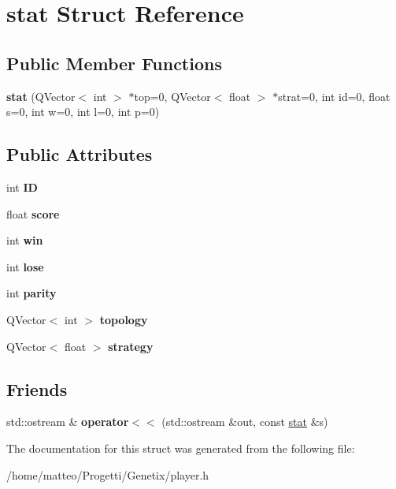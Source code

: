 \hypertarget{structstat}{}\section{stat Struct Reference}
\label{structstat}
\subsection*{Public Member Functions}
\begin{DoxyCompactItemize}
\item 
\mbox{\label{structstat_aacab74c8ceaf07e2e3ff93749dbce025}} 
{\bfseries stat} (Q\+Vector$<$ int $>$ $\ast$top=0, Q\+Vector$<$ float $>$ $\ast$strat=0, int id=0, float s=0, int w=0, int l=0, int p=0)
\end{DoxyCompactItemize}
\subsection*{Public Attributes}
\begin{DoxyCompactItemize}
\item 
\mbox{\label{structstat_ad04ac91884b5e3b802051a36ee1f8c85}} 
int {\bfseries ID}
\item 
\mbox{\label{structstat_a3fa56d7d826bb45c44f259fe54c1fe60}} 
float {\bfseries score}
\item 
\mbox{\label{structstat_a2ed87c6eae9f14eb89db1e7d3402eb46}} 
int {\bfseries win}
\item 
\mbox{\label{structstat_aa7b9c04671338f5e16b45c5b2b6cb874}} 
int {\bfseries lose}
\item 
\mbox{\label{structstat_affeb64b8e583775f458ade337dfabeae}} 
int {\bfseries parity}
\item 
\mbox{\label{structstat_a4a10d6ec8c00498b6ae396f72325655a}} 
Q\+Vector$<$ int $>$ {\bfseries topology}
\item 
\mbox{\label{structstat_ad4584c6b45b65ebf4cadf24ea8d9e776}} 
Q\+Vector$<$ float $>$ {\bfseries strategy}
\end{DoxyCompactItemize}
\subsection*{Friends}
\begin{DoxyCompactItemize}
\item 
\mbox{\label{structstat_a22be91ddd7908fc418e37946b0faeb6a}} 
std\+::ostream \& {\bfseries operator$<$$<$} (std\+::ostream \&out, const \hyperlink{structstat}{stat} \&s)
\end{DoxyCompactItemize}


The documentation for this struct was generated from the following file\+:\begin{DoxyCompactItemize}
\item 
/home/matteo/\+Progetti/\+Genetix/player.\+h\end{DoxyCompactItemize}
